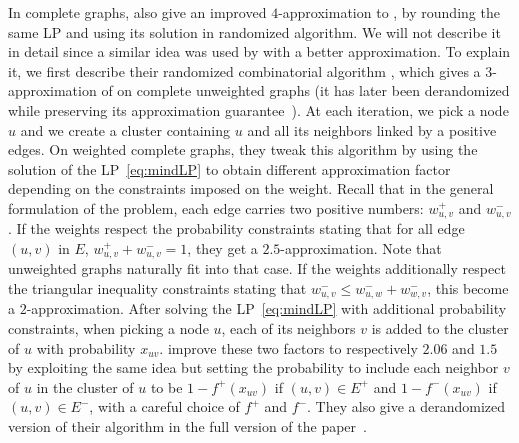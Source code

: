 In complete graphs, \textcite[Section 3]{Charikar2003} also give an improved $4$-approximation to
\mind{}, by rounding the same LP and using its solution in randomized algorithm. We will not
describe it in detail since a similar idea was used by \textcite{CCPivotConf05} with a better
approximation. To explain it, we first describe their randomized combinatorial algorithm \ccpivot{},
which gives a $3$-approximation of \mind{} on complete unweighted graphs (it has later been
derandomized while preserving its approximation guarantee~\autocite{derandomCCPivot08}). At each
iteration, we pick a node $u$ \uar{} and we create a cluster containing $u$ and all its neighbors
linked by a positive edges. On weighted complete graphs, they tweak this algorithm by using the
solution of the  LP~\eqref{eq:mindLP} to obtain different approximation factor depending on the
constraints imposed on the weight. Recall that in the general formulation of the problem, each
edge carries two positive numbers: $w_{u,v}^+$ and $w_{u,v}^-$. If the weights respect the
probability constraints stating that for all edge $(u,v)$ in $E$, $w_{u,v}^+ + w_{u,v}^- = 1$, they
get a $2.5$-approximation. Note that unweighted graphs naturally fit into that case. If the weights
additionally respect the triangular inequality constraints stating that $w_{u,v}^- \leq w_{u,w}^- +
w_{w,v}^-$, this become a $2$-approximation. After solving the LP~\eqref{eq:mindLP} with additional
probability constraints, when picking a node $u$, each of its neighbors $v$ is added to the cluster
of $u$ with probability $x_{uv}$. \Textcite{Chawla2014} improve these two factors to respectively
$2.06$ and $1.5$ by exploiting the same idea but setting the probability to include each neighbor
$v$ of $u$ in the cluster of $u$ to be $1-f^+(x_{uv})$ if $(u,v)\in E^+$ and $1-f^-(x_{uv})$ if
$(u,v)\in E^-$, with a careful choice of $f^+$ and $f^-$. They also give a derandomized version of
their algorithm in the full version of the paper~\autocite[Theorem 23]{ChawlaArxiv14}.

